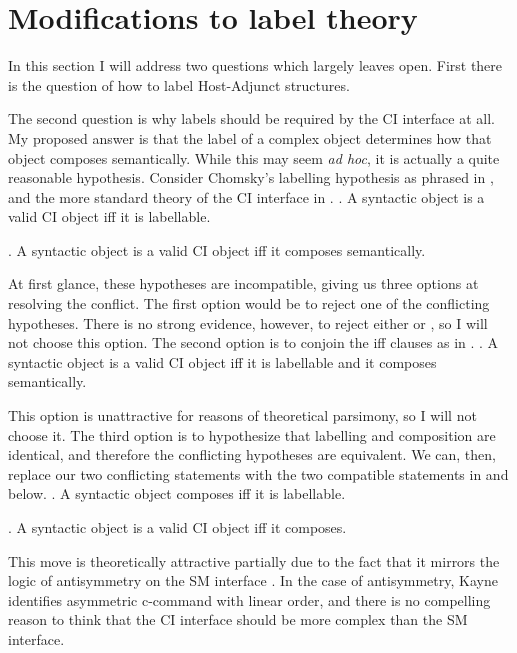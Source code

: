 \documentclass[MilwayThesis]{subfiles}
\begin{document}
\section{Modifications to label theory}\label{sec:modifications}

In this section I will address two questions which \textcite{chomsky2013problems,chomsky2015problems} largely leaves open.
First there is the question of how to label Host-Adjunct structures.


The second question is why labels should be required by the CI interface at all.
My proposed answer is that the label of a complex object determines how that object composes semantically.
While this may seem \textit{ad hoc}, it is actually a quite reasonable hypothesis.
Consider Chomsky's labelling hypothesis as phrased in \Next, and the more standard theory of the CI interface in \NNext.
\ex. A syntactic object is a valid CI object iff it is labellable.

\ex. A syntactic object is a valid CI object iff it composes semantically.

At first glance, these hypotheses are incompatible, giving us three options at resolving the conflict.
The first option would be to reject one of the conflicting hypotheses.
There is no strong evidence, however, to reject either \LLast or \Last, so I will not choose this option.
The second option is to conjoin the iff clauses as in \Next.
\ex. A syntactic object is a valid CI object iff it is labellable and it composes semantically.

This option is unattractive for reasons of theoretical parsimony, so I will not choose it.
The third option is to hypothesize that labelling and composition are identical, and therefore the conflicting hypotheses are equivalent.
We can, then, replace our two conflicting statements with the two compatible statements in \Next and \NNext below.
\ex. A syntactic object composes iff it is labellable.

\ex. A syntactic object is a valid CI object iff it composes.

This move is theoretically attractive partially due to the fact that it mirrors the logic of antisymmetry on the SM interface \parencite{kayne1994antisymmetry}.
In the case of antisymmetry, Kayne identifies asymmetric c-command with linear order, and there is no compelling reason to think that the CI interface should be more complex than the SM interface.
\end{document}
